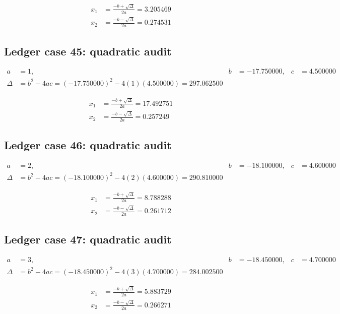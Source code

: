 \documentclass[11pt,a4paper]{article}
\begin{document}
\begin{align}
x_1 &= \frac{-b+\sqrt{\Delta}}{2a} = 3.205469 \\
x_2 &= \frac{-b-\sqrt{\Delta}}{2a} = 0.274531
\end{align}

\subsection{Ledger case 45: quadratic audit}
\begin{align}
a &= 1, & b &= -17.750000, & c &= 4.500000 \\
\Delta &= b^2-4ac = (-17.750000)^2 - 4(1)(4.500000) = 297.062500
\end{align}

\begin{align}
x_1 &= \frac{-b+\sqrt{\Delta}}{2a} = 17.492751 \\
x_2 &= \frac{-b-\sqrt{\Delta}}{2a} = 0.257249
\end{align}

\newpage

\subsection{Ledger case 46: quadratic audit}
\begin{align}
a &= 2, & b &= -18.100000, & c &= 4.600000 \\
\Delta &= b^2-4ac = (-18.100000)^2 - 4(2)(4.600000) = 290.810000
\end{align}

\begin{align}
x_1 &= \frac{-b+\sqrt{\Delta}}{2a} = 8.788288 \\
x_2 &= \frac{-b-\sqrt{\Delta}}{2a} = 0.261712
\end{align}

\subsection{Ledger case 47: quadratic audit}
\begin{align}
a &= 3, & b &= -18.450000, & c &= 4.700000 \\
\Delta &= b^2-4ac = (-18.450000)^2 - 4(3)(4.700000) = 284.002500
\end{align}

\begin{align}
x_1 &= \frac{-b+\sqrt{\Delta}}{2a} = 5.883729 \\
x_2 &= \frac{-b-\sqrt{\Delta}}{2a} = 0.266271
\end{align}
\end{document}
